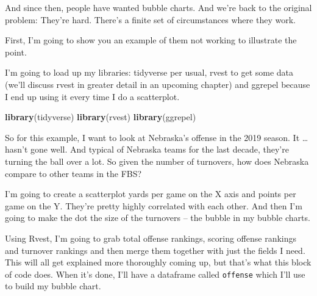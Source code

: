 \documentclass[]{book}
\newenvironment{Shaded}{\begin{snugshade}}{\end{snugshade}}
\newcommand{\KeywordTok}[1]{\textcolor[rgb]{0.13,0.29,0.53}{\textbf{#1}}}
\newcommand{\NormalTok}[1]{#1}
\begin{document}
And since then, people have wanted bubble charts. And we're back to the original problem: They're hard. There's a finite set of circumstances where they work.

First, I'm going to show you an example of them not working to illustrate the point.

I'm going to load up my libraries: tidyverse per usual, rvest to get some data (we'll discuss rvest in greater detail in an upcoming chapter) and ggrepel because I end up using it every time I do a scatterplot.

\begin{Shaded}
\begin{Highlighting}[]
\KeywordTok{library}\NormalTok{(tidyverse)}
\KeywordTok{library}\NormalTok{(rvest)}
\KeywordTok{library}\NormalTok{(ggrepel)}
\end{Highlighting}
\end{Shaded}

So for this example, I want to look at Nebraska's offense in the 2019 season. It \ldots{} hasn't gone well. And typical of Nebraska teams for the last decade, they're turning the ball over a lot. So given the number of turnovers, how does Nebraska compare to other teams in the FBS?

I'm going to create a scatterplot yards per game on the X axis and points per game on the Y. They're pretty highly correlated with each other. And then I'm going to make the dot the size of the turnovers -- the bubble in my bubble charts.

Using Rvest, I'm going to grab total offense rankings, scoring offense rankings and turnover rankings and then merge them together with just the fields I need. This will all get explained more thoroughly coming up, but that's what this block of code does. When it's done, I'll have a dataframe called \texttt{offense} which I'll use to build my bubble chart.
\end{document}
